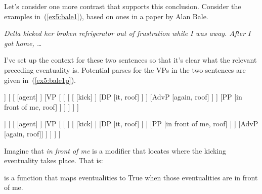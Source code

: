 Let's consider one more contrast that supports this conclusion. Consider the examples in~(\ref{ex5:bale1}), based on ones in a paper by Alan Bale.\cite{Bale:2007}
\begin{exe}
	\raggedright
	\sn
	\emph{Della kicked her broken refrigerator out of frustration while I was away. After I got home, \ldots}
	\ex \label{ex5:bale1}%
	\begin{xlist}
	\end{xlist}
	\hspace*{\fill} \citep[inspired by (27):~462]{Bale:2007} \hspace*{.5in}
\end{exe}
I've set up the context for these two sentences so that it's clear what the relevant preceding eventuality is. Potential parses for the VPs in the two sentences are given in~(\ref{ex5:bale1p}).
\begin{fullwidth}
	\medskip
\begin{exe}
	\raggedright
	\ex \label{ex5:bale1p} 
	\small
	\begin{forest}
	[vP
		[DP [she, roof]]
		[ 
			[ ]
			[VP [
				[
					[
						[ [kick] ]
						[DP [it, roof] ]
					 ]
					[AdvP [again, roof] ]
				 ]
				[PP [in front of me, roof] ]
			] ]
		]
	]
	\end{forest}
	\hspace*{10pt}
	\begin{forest}
	[vP
		[DP [she, roof]]
		[\ibar{v} 
			[ ]
			[VP [\ibar{V}
				[\ibar{V}
					[\ibar{V}
						[\obar{V} [kick] ]
						[DP [it, roof] ]
					 ]
					[PP [in front of me, roof] ]
				 ]
				[AdvP [again, roof]]
			] ]
		]
	]
	\end{forest}
\end{exe}
\medskip
\end{fullwidth}
Imagine that \emph{in front of me} is a modifier that locates where the kicking eventuality takes place. That is:
\begin{exe}
	\raggedright
	\ex \label{ex5:denon} 
	 is a function that maps eventualities to True when those eventualities are in front of me.
\end{exe}
